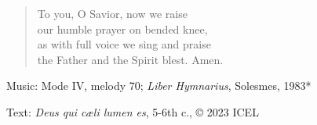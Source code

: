 \hymn



\setlength{\vleftmargin}{2em}
\begin{verse}
To you, O Savior, now we raise\\
our humble prayer on bended knee,\\
as with full voice we sing and praise\\
the Father and the Spirit blest. Amen.
\end{verse}
\setlength{\vleftmargin}{\defleftmargini}

\begin{hymnsource}
Music: Mode IV, melody 70; \emph{Liber Hymnarius}, Solesmes, 1983*

Text: \emph{Deus qui cæli lumen es}, 5-6th c., © 2023 ICEL
\end{hymnsource}
